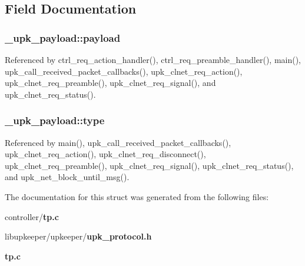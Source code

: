 \subsection{Field Documentation}
\subsubsection[{payload}]{ {\bf \_\-upk\_\-payload::payload}}\label{struct__upk__payload_a22f7f03c4df6792a307fe00cd8a72dbb}


Referenced by ctrl\_\-req\_\-action\_\-handler(), ctrl\_\-req\_\-preamble\_\-handler(), main(), upk\_\-call\_\-received\_\-packet\_\-callbacks(), upk\_\-clnet\_\-req\_\-action(), upk\_\-clnet\_\-req\_\-preamble(), upk\_\-clnet\_\-req\_\-signal(), and upk\_\-clnet\_\-req\_\-status().

\subsubsection[{type}]{ {\bf \_\-upk\_\-payload::type}}\label{struct__upk__payload_ac6a896e3a9a5ecf0efdc6c092f959d1c}


Referenced by main(), upk\_\-call\_\-received\_\-packet\_\-callbacks(), upk\_\-clnet\_\-req\_\-action(), upk\_\-clnet\_\-req\_\-disconnect(), upk\_\-clnet\_\-req\_\-preamble(), upk\_\-clnet\_\-req\_\-signal(), upk\_\-clnet\_\-req\_\-status(), and upk\_\-net\_\-block\_\-until\_\-msg().



The documentation for this struct was generated from the following files:\begin{DoxyCompactItemize}
\item 
controller/{\bf tp.c}\item 
libupkeeper/upkeeper/{\bf upk\_\-protocol.h}\item 
{\bf tp.c}\end{DoxyCompactItemize}
